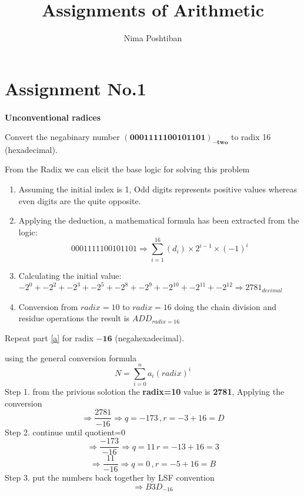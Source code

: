 \documentclass[16pt,answers]{exam}
\author{Nima Poshtiban}
\title{Assignments of Arithmetic}
\date{\displaydate{date}}
\begin{document}
	\maketitle
	\tableofcontents
	\pagebreak
	\section{Assignment No.1}
\paragraph{}
\textbf{Unconventional radices}
\begin{questions}
\question Convert the negabinary number $\mathbf{(0001 1111 0010 1101)_{-two}}$ to radix 16
	(hexadecimal).\label{a}
	\begin{solution}[space]
		From the Radix we can elicit the base logic for solving this problem\newline
		\begin{enumerate}
			\item Assuming the initial index is 1, Odd digits represents positive values whereas even digits are the quite opposite.
			\item Applying the deduction, a mathematical formula has been extracted from the logic:
			\[
			  0001 1111 0010 1101 \Longrightarrow \sum_{i=1}^{16}{(d_{i})\times2^{i-1}\times(-1)^{i} }
			\]
			\item Calculating the initial value:
			\(-2^{0} + -2^{2} + -2^{3} + -2^{5}  + - 2^{8}  + -2^{9} + -2^{10} + -2^{11} + -2^{12} \Longrightarrow 2781_{decimal}\)
			\item Conversion from \(radix=10\) to \(radix=16\)
			doing the chain division and residue operations the result is \( ADD_{radix=16} \)
		\end{enumerate}
	\end{solution}
\question Repeat part \ref{a} for radix $\mathbf{-16}$ (negahexadecimal).
	\begin{solution}[space]
	using the general conversion formula
	\[N=\sum_{i=0}^{n}{a_{i}(radix)^{i}}\]
	Step 1. from the privious solotion the \textbf{radix=10} value is \textbf{2781}, Applying the conversion
	\[
		\Longrightarrow \frac{2781}{-16} \Rightarrow q=-173\,,r=-3+16 = D
	\]
	Step 2. continue until quotient=0
	\[
		\Longrightarrow \frac{-173}{-16} \Rightarrow q=11\,r=-13+16 = 3  
	\]
	\[
		\Longrightarrow \frac{11}{-16} \Rightarrow q=0\,,r= -5 + 16 = B
	\]
	Step 3. put the numbers back together by LSF convention
	\[
		\Rightarrow B3D_{-16}
	\]
\end{solution}

\end{questions}
\end{document}
